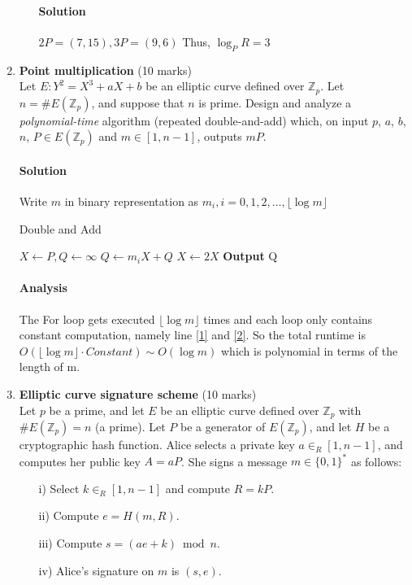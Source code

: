 \documentclass[11pt]{article}
\newcommand{\ZZ}{{\mathbb Z}}
\newcommand{\floor}[1]{\lfloor #1 \rfloor}
\begin{document}
\begin{enumerate}
\begin{enumerate}
\paragraph{Solution} $2P=(7,15),3P=(9,6)$ Thus, $\log_P R = 3$
\end{enumerate}

\newpage
\item {\bf Point multiplication} (10 marks)\\
Let $E : Y^2 = X^3 + aX + b$ be an elliptic curve defined over $\ZZ_p$.
Let $n = \# E(\ZZ_p)$, and suppose that $n$ is prime. Design and analyze
a \emph{polynomial-time} algorithm (repeated double-and-add) which, on input
$p$, $a$, $b$, $n$, $P \in E(\ZZ_p)$ and $m \in [1,n-1]$, outputs $mP$.
\paragraph{Solution}
Write $m$ in binary representation as $m_i, i = 0,1,2,\dots, \floor{\log m}$\\
\begin{algorithm}
\caption{Double and Add}
\begin{algorithmic}[1]
\State $X \gets P, Q \gets \infty$
\For {i from 0 to $\floor{\log m}$}
\State $Q \gets m_iX+Q$ \label{1}
\State $X \gets 2X$ \label{2}
\EndFor
\State \textbf{Output} Q
\end{algorithmic}
\end{algorithm}
\paragraph{Analysis} The For loop gets executed $\floor{\log m}$ times and each loop only contains constant computation, namely line \ref{1} and \ref{2}. So the total runtime is $O(\floor{\log m} \cdot Constant) \sim O(\log m)$ which is polynomial in terms of the length of m.

\newpage
\item {\bf Elliptic curve signature scheme} (10 marks)\\
Let $p$ be a prime, and let $E$ be an elliptic curve defined over $\ZZ_p$
with $\# E(\ZZ_p) = n$ (a prime). Let $P$ be a generator of $E(\ZZ_p)$,
and let $H$ be a cryptographic hash function. Alice
selects a private key $a \in_R [1,n-1]$, and computes her public key
$A = aP$. She signs a message $m \in \{0,1\}^*$ as follows:
\begin{itemize}
\itemsep 0mm
\item[i)] Select $k \in_R [1,n-1]$ and compute $R = kP$.
\item[ii)] Compute $e = H(m,R)$.
\item[iii)] Compute $s = (ae+k) \bmod{n}$.
\item[iv)] Alice's signature on $m$ is $(s,e)$.
\end{itemize}


\end{enumerate}
\end{document}
